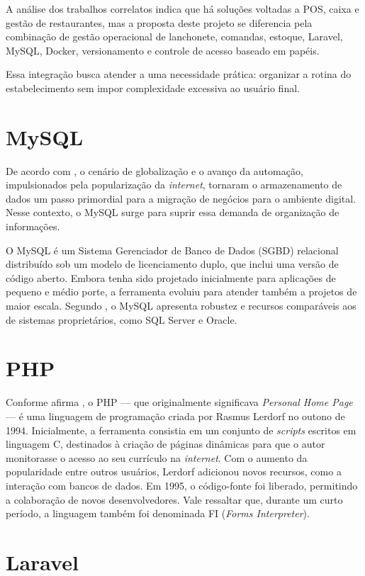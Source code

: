 A análise dos trabalhos correlatos indica que há soluções voltadas a POS, caixa e gestão de restaurantes, mas a proposta deste projeto se diferencia pela combinação de gestão operacional de lanchonete, comandas, estoque, Laravel, MySQL, Docker, versionamento e controle de acesso baseado em papéis.

Essa integração busca atender a uma necessidade prática: organizar a rotina do estabelecimento sem impor complexidade excessiva ao usuário final.

\section{MySQL}

De acordo com , o cenário de globalização e o avanço da automação, impulsionados pela popularização da \textit{internet}, tornaram o armazenamento de dados um passo primordial para a migração de negócios para o ambiente digital. Nesse contexto, o MySQL surge para suprir essa demanda de organização de informações.

O MySQL é um Sistema Gerenciador de Banco de Dados (SGBD) relacional distribuído sob um modelo de licenciamento duplo, que inclui uma versão de código aberto. Embora tenha sido projetado inicialmente para aplicações de pequeno e médio porte, a ferramenta evoluiu para atender também a projetos de maior escala. Segundo , o MySQL apresenta robustez e recursos comparáveis aos de sistemas proprietários, como SQL Server e Oracle.

\section{PHP}
Conforme afirma , o PHP — que originalmente significava \textit{Personal Home Page} — é uma linguagem de programação criada por Rasmus Lerdorf no outono de 1994. Inicialmente, a ferramenta consistia em um conjunto de \textit{scripts} escritos em linguagem C, destinados à criação de páginas dinâmicas para que o autor monitorasse o acesso ao seu currículo na \textit{internet}. Com o aumento da popularidade entre outros usuários, Lerdorf adicionou novos recursos, como a interação com bancos de dados. Em 1995, o código-fonte foi liberado, permitindo a colaboração de novos desenvolvedores. Vale ressaltar que, durante um curto período, a linguagem também foi denominada FI (\textit{Forms Interpreter}).
\section{Laravel}

